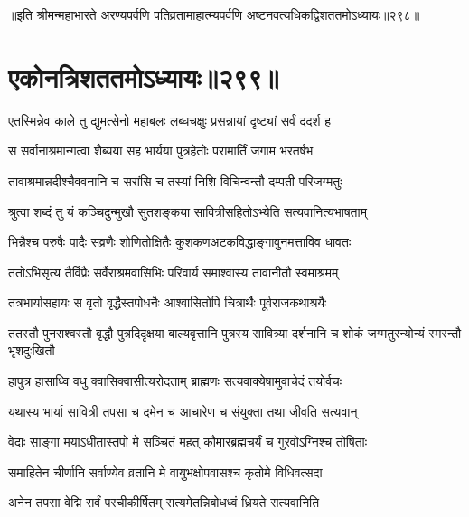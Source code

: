 ॥इति श्रीमन्महाभारते अरण्यपर्वणि पतिव्रतामाहात्म्यपर्वणि अष्टनवत्यधिकद्विशततमोऽध्यायः॥२९८॥


\chapter{एकोनत्रिशततमोऽध्यायः॥२९९॥}


\twolineshloka
{एतस्मिन्नेव काले तु द्युमत्सेनो महाबलः}
{लब्धचक्षुः प्रसन्नायां दृष्ट्यां सर्वं ददर्श ह}


\twolineshloka
{स सर्वानाश्रमान्गत्वा शैब्यया सह भार्यया}
{पुत्रहेतोः परामार्तिं जगाम भरतर्षभ}


\twolineshloka
{तावाश्रमान्नदीश्चैववनानि च सरांसि च}
{तस्यां निशि विचिन्वन्तौ दम्पती परिजग्मतुः}


\twolineshloka
{श्रुत्वा शब्दं तु यं कञ्चिदुन्मुखौ सुतशङ्कया}
{सावित्रीसहितोऽभ्येति सत्यवानित्यभाषताम्}


\twolineshloka
{भिन्नैश्च परुषैः पादैः सव्रणैः शोणितोक्षितैः}
{कुशकणअटकविद्धाङ्गावुनमत्ताविव धावतः}


\twolineshloka
{ततोऽभिसृत्य तैर्विप्रैः सर्वैराश्रमवासिभिः}
{परिवार्य समाश्वास्य तावानीतौ स्वमाश्रमम्}


\twolineshloka
{तत्रभार्यासहायः स वृतो वृद्धैस्तपोधनैः}
{आश्वासितोपि चित्रार्थैः पूर्वराजकथाश्रयैः}


\threelineshloka
{ततस्तौ पुनराश्वस्तौ वृद्धौ पुत्रदिदृक्षया}
{बाल्यवृत्तानि पुत्रस्य सावित्र्या दर्शनानि च}
{शोकं जग्मतुरन्योन्यं स्मरन्तौ भृशदुःखितौ}


\twolineshloka
{हापुत्र हासाध्वि वधु क्वासिक्वासीत्यरोदताम्}
{ब्राह्मणः सत्यवाक्येषामुवाचेदं तयोर्वचः}




\twolineshloka
{यथास्य भार्या सावित्री तपसा च दमेन च}
{आचारेण च संयुक्ता तथा जीवति सत्यवान्}




\twolineshloka
{वेदाः साङ्गा मयाऽधीतास्तपो मे सञ्चितं महत्}
{कौमारब्रह्मचर्यं च गुरवोऽग्निश्च तोषिताः}


\twolineshloka
{समाहितेन चीर्णानि सर्वाण्येव व्रतानि मे}
{वायुभक्षोपवासश्च कृतोमे विधिवत्सदा}


\twolineshloka
{अनेन तपसा वेद्मि सर्वं परचीकीर्षितम्}
{सत्यमेतन्निबोधध्वं ध्रियते सत्यवानिति}




